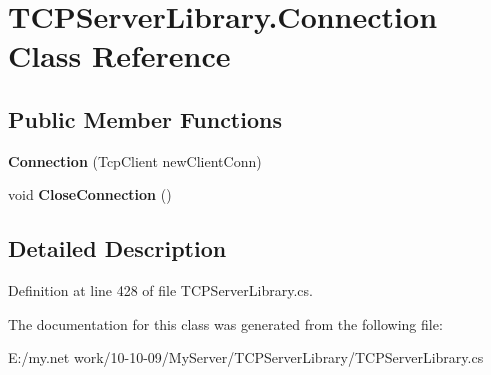 \hypertarget{class_t_c_p_server_library_1_1_connection}{
\section{TCPServerLibrary.Connection Class Reference}
\label{class_t_c_p_server_library_1_1_connection}
}
\subsection*{Public Member Functions}
\begin{DoxyCompactItemize}
\item 
\hypertarget{class_t_c_p_server_library_1_1_connection_a60a33d03f73fdffcd8dcb2936b980bcb}{
{\bfseries Connection} (TcpClient newClientConn)}
\label{class_t_c_p_server_library_1_1_connection_a60a33d03f73fdffcd8dcb2936b980bcb}

\item 
\hypertarget{class_t_c_p_server_library_1_1_connection_aee78582949de5a4118f2bec8a42b4b20}{
void {\bfseries CloseConnection} ()}
\label{class_t_c_p_server_library_1_1_connection_aee78582949de5a4118f2bec8a42b4b20}

\end{DoxyCompactItemize}


\subsection{Detailed Description}


Definition at line 428 of file TCPServerLibrary.cs.

The documentation for this class was generated from the following file:\begin{DoxyCompactItemize}
\item 
E:/my.net work/10-\/10-\/09/MyServer/TCPServerLibrary/TCPServerLibrary.cs\end{DoxyCompactItemize}
